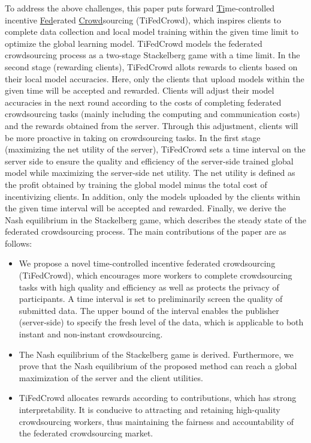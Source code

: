 \documentclass[final,1p,times]{elsarticle}
\begin{document}
To address the above challenges, this paper puts forward \underline{Ti}me-controlled incentive \underline{Fed}erated \underline{Crowd}sourcing (TiFedCrowd), which inspires clients to complete data collection and local model training within the given time limit to optimize the global learning model. TiFedCrowd models the federated crowdsourcing process as a two-stage Stackelberg game \citep{li2017review} with a time limit. In the second stage (rewarding clients), TiFedCrowd allots rewards to clients based on their local model accuracies. Here, only the clients that upload models within the given time will be accepted and rewarded. Clients will adjust their model accuracies in the next round according to the costs of completing federated crowdsourcing tasks (mainly including the computing and communication costs) and the rewards obtained from the server. Through this adjustment, clients will be more proactive in taking on crowdsourcing tasks. In the first stage (maximizing the net utility of the server), TiFedCrowd sets a time interval on the server side to ensure the quality and efficiency of the server-side trained global model while maximizing the server-side net utility. The net utility is defined as the profit obtained by training the global model minus the total cost of incentivizing clients. In addition, only the models uploaded by the clients within the given time interval will be accepted and rewarded. Finally, we derive the Nash equilibrium in the Stackelberg game, which describes the steady state of the federated crowdsourcing process. The main contributions of the paper are as follows: 

\begin{itemize}
	\item We propose a novel time-controlled incentive federated crowdsourcing (TiFedCrowd), which encourages more workers to complete crowdsourcing tasks with high quality and efficiency as well as protects the privacy of participants. A time interval is set to preliminarily screen the quality of submitted data. The upper bound of the interval enables the publisher (server-side) to specify the fresh level of the data, which is applicable to both instant and non-instant crowdsourcing.
	\item The Nash equilibrium of the Stackelberg game is derived. Furthermore, we prove that the Nash equilibrium of the proposed method can reach a  global maximization of the server and the client utilities.
	\item TiFedCrowd allocates rewards according to contributions, which has strong interpretability. It is conducive to attracting and retaining high-quality crowdsourcing workers, thus maintaining the fairness and accountability of the federated crowdsourcing market.
\end{itemize}
\end{document}
